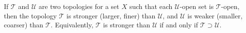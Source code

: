 If $\mathcal{T}$ and $\mathcal{U}$ are two topologies for a set $X$ such that each $\mathcal{U}$-open set is $\mathcal{T}$-open, then the topology $\mathcal{T}$ is stronger (larger, finer) than $\mathcal{U}$, and $\mathcal{U}$ is weaker (smaller, coarser) than $\mathcal{T}$. Equivalently, $\mathcal{T}$ is stronger than $\mathcal{U}$ if and only if $\mathcal{T} \supset \mathcal{U}$.
